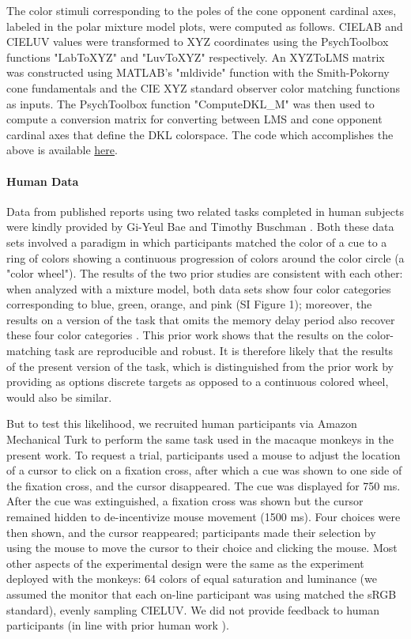 \documentclass[9pt,biorxiv,lineno,onehalfspacing]{lapreprint}
\begin{document}
\begin{refsection}
The color stimuli corresponding to the poles of the cone opponent cardinal axes, labeled in the polar mixture model plots, were computed as follows. 
CIELAB and CIELUV values were transformed to XYZ coordinates using the PsychToolbox functions "LabToXYZ" and "LuvToXYZ" respectively.
An XYZToLMS matrix was constructed using MATLAB's "mldivide" function with the Smith-Pokorny cone fundamentals and the CIE XYZ standard observer color matching functions as inputs.
The PsychToolbox function "ComputeDKL\_M" was then used to compute a conversion matrix for converting between LMS and cone opponent cardinal axes that define the DKL colorspace. 
The code which accomplishes the above is available \href{https://github.com/NEI-LSR/MacaqueColorCategories/blob/main/Analyses/DKL/computeDKL_XYZ.m}{here}.

\paragraph{Human Data}

Data from published reports using two related tasks completed in human subjects were kindly provided by Gi-Yeul Bae \citep{bae_why_2015} and Timothy Buschman \citep{panichello_error-correcting_2019}.
Both these data sets involved a paradigm in which participants matched the color of a cue to a ring of colors showing a continuous progression of colors around the color circle (a "color wheel"). 
The results of the two prior studies are consistent with each other: when analyzed with a mixture model, both data sets show four color categories corresponding to blue, green, orange, and pink (SI Figure 1); moreover, the results on a version of the task that omits the memory delay period also recover these four color categories \citep{bae_why_2015}.
This prior work shows that the results on the color-matching task are reproducible and robust. 
It is therefore likely that the results of the present version of the task, which is distinguished from the prior work by providing as options discrete targets as opposed to a continuous colored wheel, would also be similar. 

But to test this likelihood, we recruited human participants via Amazon Mechanical Turk to perform the same task used in the macaque monkeys in the present work. 
To request a trial, participants used a mouse to adjust the location of a cursor to click on a fixation cross, after which a cue was shown to one side of the fixation cross, and the cursor disappeared. 
The cue was displayed for 750 ms. 
After the cue was extinguished, a fixation cross was shown but the cursor remained hidden to de-incentivize mouse movement (1500 ms). 
Four choices were then shown, and the cursor reappeared; participants made their selection by using the mouse to move the cursor to their choice and clicking the mouse. 
Most other aspects of the experimental design were the same as the experiment deployed with the monkeys: 64 colors of equal saturation and luminance (we assumed the monitor that each on-line participant was using matched the sRGB standard), evenly sampling CIELUV. We did not provide feedback to human participants (in line with prior human work \citep{bae_why_2015,panichello_error-correcting_2019}). 


\end{refsection}
\end{document}
